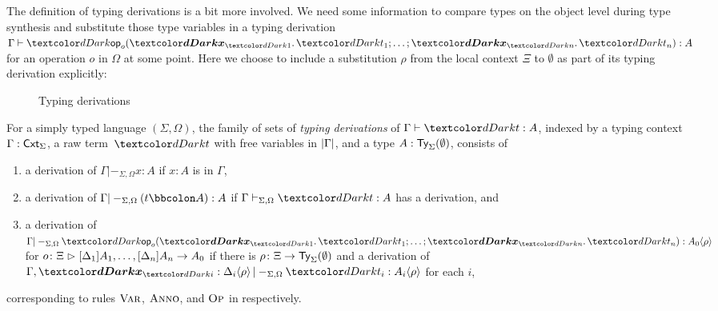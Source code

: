 The definition of typing derivations is a bit more involved.
We need some information to compare types on the object level during type synthesis and substitute those type variables in a typing derivation $\Gamma \vdash \tmOpts : A$ for an operation $o$ in $\Omega$ at some point.
Here we choose to include a substitution $\rho$ from the local context $\Xi$ to $\emptyset$ as part of its typing derivation explicitly:

\begin{definition}\label{def:typing-derivations}
  \begin{figure}
    \centering
    \small
    \caption{Typing derivations}
    \label{fig:extrinsic-typing}
  \end{figure}
  For a simply typed language $(\Sigma, \Omega)$, the family of sets of \emph{typing derivations} of $\Gamma \vdash \isTerm{t} : A$, indexed by a typing context $\Gamma : \mathsf{Cxt}_\Sigma$, a raw term~$\isTerm{t}$ with free variables in $\left|\Gamma\right|$, and a type $A : \mathsf{Ty}_\Sigma(\emptyset)$, consists of 
  \begin{enumerate}
    \item a derivation of $\Gamma |-_{\Sigma, \Omega} x : A$ if $x : A$ is in $\Gamma$,
    \item a derivation of $\Gamma |-_{\Sigma, \Omega} (t \annotate A) : A$ if $\Gamma \vdash_{\Sigma, \Omega} \isTerm{t} : A$ has a derivation, and
    \item a derivation of $\Gamma |-_{\Sigma, \Omega} \tmOpts : \simsub{A_0}{\rho}$ for $o\colon \Xi \mathrel{\rhd} [\Delta_{1}]A_{1}, \ldots, [\Delta_{n}]A_{n} \to A_0$ if there is $\rho\colon \Xi \to \mathsf{Ty}_{\Sigma}(\emptyset)$ and a derivation of $\Gamma, \vars{x}_{\isTerm{i}} : \simsub{\Delta_i}{\rho} |-_{\Sigma, \Omega} \isTerm{t_i} : \simsub{A_i}{\rho}$ for each $i$,
  \end{enumerate}
  corresponding to rules $\textnormal{\textsc{Var}}$, $\textnormal{\textsc{Anno}}$, and $\textnormal{\textsc{Op}}$ in  respectively.
\end{definition}

